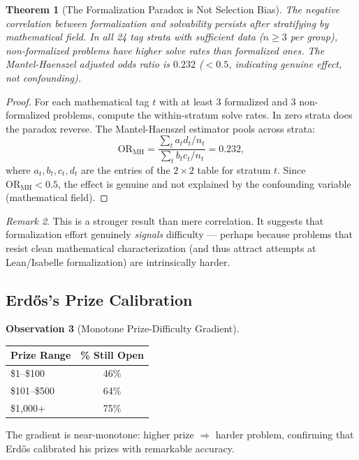 \documentclass[11pt,a4paper]{article}
\newtheorem{theorem}{Theorem}[section]
\theoremstyle{definition}
\newtheorem{observation}[theorem]{Observation}
\theoremstyle{remark}
\newtheorem{remark}[theorem]{Remark}
\begin{document}
\begin{theorem}[The Formalization Paradox is Not Selection Bias]\label{thm:form-paradox}
The negative correlation between formalization and solvability persists after
stratifying by mathematical field. In all 24 tag strata with sufficient data
($n \geq 3$ per group), non-formalized problems have higher solve rates
than formalized ones. The Mantel-Haenszel adjusted odds ratio is $0.232$
($< 0.5$, indicating genuine effect, not confounding).
\end{theorem}

\begin{proof}
For each mathematical tag $t$ with at least 3 formalized and 3 non-formalized
problems, compute the within-stratum solve rates. In zero strata does the
paradox reverse. The Mantel-Haenszel estimator pools across strata:
$$\mathrm{OR}_{\mathrm{MH}} = \frac{\sum_t a_t d_t / n_t}{\sum_t b_t c_t / n_t}
= 0.232,$$
where $a_t, b_t, c_t, d_t$ are the entries of the $2 \times 2$ table for
stratum $t$. Since $\mathrm{OR}_{\mathrm{MH}} < 0.5$, the effect is genuine
and not explained by the confounding variable (mathematical field).
\end{proof}

\begin{remark}
This is a stronger result than mere correlation. It suggests that
formalization effort genuinely \emph{signals} difficulty --- perhaps because
problems that resist clean mathematical characterization (and thus attract
attempts at Lean/Isabelle formalization) are intrinsically harder.
\end{remark}

\subsection{Erd\H{o}s's Prize Calibration}

\begin{observation}[Monotone Prize-Difficulty Gradient]
\begin{center}
\begin{tabular}{lc}
\toprule
Prize Range & \% Still Open \\
\midrule
\$1--\$100 & 46\% \\
\$101--\$500 & 64\% \\
\$1,000+ & 75\% \\
\bottomrule
\end{tabular}
\end{center}
The gradient is near-monotone: higher prize $\Rightarrow$ harder problem,
confirming that Erd\H{o}s calibrated his prizes with remarkable accuracy.
\end{observation}
\end{document}
